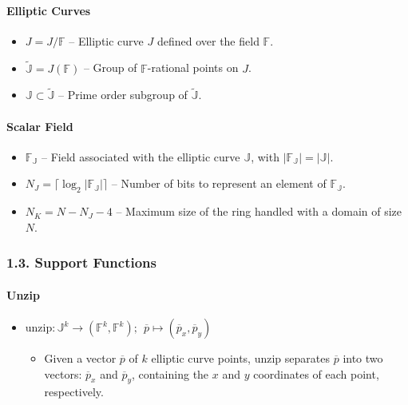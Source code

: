 \documentclass[
]{article}
\providecommand{\tightlist}{%
  \setlength{\itemsep}{0pt}\setlength{\parskip}{0pt}}
\begin{document}
\hypertarget{elliptic-curves}{%
\paragraph{Elliptic Curves}\label{elliptic-curves}}

\begin{itemize}
\tightlist
\item
  \(J = J / \mathbb{F}\) -- Elliptic curve \(J\) defined over the field
  \(\mathbb{F}\).
\item
  \(\tilde{\mathbb{J}} = J(\mathbb{F})\) -- Group of
  \(\mathbb{F}\)-rational points on \(J\).
\item
  \(\mathbb{J} \subset \tilde{\mathbb{J}}\) -- Prime order subgroup of
  \(\tilde{\mathbb{J}}\).
\end{itemize}

\hypertarget{scalar-field}{%
\paragraph{Scalar Field}\label{scalar-field}}

\begin{itemize}
\tightlist
\item
  \(\mathbb{F_J}\) -- Field associated with the elliptic curve
  \(\mathbb{J}\), with \(|\mathbb{F_J}| = |\mathbb{J}|\).
\item
  \(N_J = \lceil \log_2 |\mathbb{F_J}| \rceil\) -- Number of bits to
  represent an element of \(\mathbb{F_J}\).
\item
  \(N_K = N - N_J - 4\) -- Maximum size of the ring handled with a
  domain of size \(N\).
\end{itemize}

\hypertarget{support-functions}{%
\subsubsection{1.3. Support Functions}\label{support-functions}}

\hypertarget{unzip}{%
\paragraph{Unzip}\label{unzip}}

\begin{itemize}
\tightlist
\item
  \(\text{unzip}: \mathbb{J}^k \to (\mathbb{F}^k, \mathbb{F}^k);\ \ \overline{p} \mapsto (\overline{p}_x, \overline{p}_y)\)

  \begin{itemize}
  \tightlist
  \item
    Given a vector \(\overline{p}\) of \(k\) elliptic curve points,
    \(\text{unzip}\) separates \(\overline{p}\) into two vectors:
    \(\overline{p}_x\) and \(\overline{p}_y\), containing the \(x\) and
    \(y\) coordinates of each point, respectively.
  \end{itemize}
\end{itemize}
\end{document}
